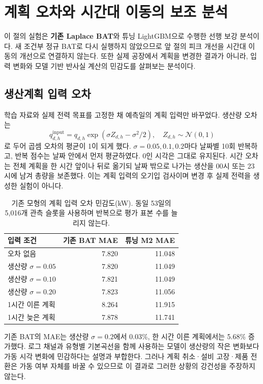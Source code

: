 \section{계획 오차와 시간대 이동의 보조 분석}
\label{sec:legacy}
이 절의 실험은 \textbf{기존 Laplace BAT}와 튜닝 LightGBM으로 수행한 선행 보강 분석이다. 새 조건부 정규 BAT로 다시 실행하지 않았으므로 앞 절의 피크 개선을 시간대 이동의 개선으로 연결하지 않는다. 또한 실제 공장에서 계획을 변경한 결과가 아니라, 입력 변화와 모델 기반 반사실 계산의 민감도를 살펴보는 분석이다.

\subsection{생산계획 입력 오차}
학습 자료와 실제 전력 목표를 고정한 채 예측일의 계획 입력만 바꾸었다. 생산량 오차는
\begin{equation}
q^{\mathrm{input}}_{d,h}=q_{d,h}\exp(\sigma Z_{d,h}-\sigma^2/2),
\quad Z_{d,h}\sim\mathcal N(0,1)
\end{equation}
로 두어 곱셈 오차의 평균이 1이 되게 했다. $\sigma=0.05,0.1,0.2$마다 날짜별 10회 반복하고, 반복 점수는 날짜 안에서 먼저 평균하였다. 0인 시각은 그대로 유지된다. 시간 오차는 전체 계획을 한 시간 앞이나 뒤로 옮기되 날짜 밖으로 나가는 생산을 00시 또는 23시에 남겨 총량을 보존했다. 이는 계획 입력의 오기입 검사이며 변경 후 실제 전력을 생성한 실험이 아니다.

\begin{table}[t]
\centering\small
\begin{tabular}{@{}lrr@{}}
\toprule
입력 조건 & 기존 BAT MAE & 튜닝 M2 MAE \\
\midrule
오차 없음 & 7.820 & 11.048 \\
생산량 $\sigma=0.05$ & 7.820 & 11.049 \\
생산량 $\sigma=0.10$ & 7.821 & 11.049 \\
생산량 $\sigma=0.20$ & 7.823 & 11.056 \\
1시간 이른 계획 & 8.264 & 11.915 \\
1시간 늦은 계획 & 7.878 & 11.741 \\
\bottomrule
\end{tabular}
\caption{기존 모형의 계획 입력 오차 민감도(kW). 동일 53일의 5,016개 관측 슬롯을 사용하며 반복으로 평가 표본 수를 늘리지 않는다.}
\label{tab:plan-error}
\end{table}

기존 BAT의 MAE는 생산량 $\sigma=0.2$에서 0.03\%, 한 시간 이른 계획에서는 5.68\% 증가했다. 로그 채널과 유형별 기본곡선을 함께 사용하는 모델이 생산량의 작은 변화보다 가동 시각 변화에 민감하다는 설명과 부합한다. 그러나 계획 취소·설비 고장·제품 전환은 가동 여부 자체를 바꿀 수 있으므로 이 결과로 그러한 상황의 강건성을 주장하지 않는다.


